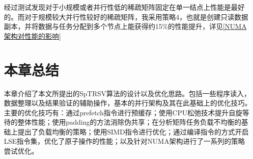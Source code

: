经过测试发现对于小规模或者并行性低的稀疏矩阵固定在单一结点上性能是最好的。而对于规模较大并行性较好的稀疏矩阵，我采用策略4，也就是创建只读数据副本，并将数据与任务分配到多个节点上能获得约15\%的性能提升，详见\ref{NUMA架构对性能的影响}

\section{本章总结}

本章介绍了本文所提出的SpTRSV算法的设计以及优化思路。包括一些程序读入，数据整理以及结果验证的辅助操作，基本的并行架构及其在此基础上的优化技巧。主要的优化技巧有：通过prefetch指令进行预缓存；使用CPU松弛技术提升自旋等待的整体性能；使用padding的方法消除伪共享；在分析矩阵任务负载不均衡的基础上提出了负载均衡的策略；使用SIMD指令进行优化；通过编译指令的方式开启LSE指令集，优化了原子操作的性能；以及针对NUMA架构进行了一系列的策略尝试优化。


\endinput